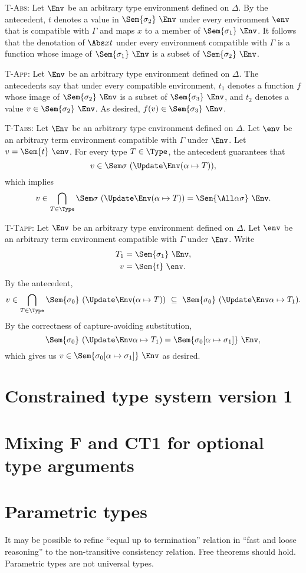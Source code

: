 \documentclass{amsart}
\begin{document}
\textsc{T-Abs}: Let $\Env$ be an arbitrary type environment
defined on $\Delta$. By the antecedent, $t$ denotes a value in
$\Sem{\sigma_2}~\Env$ under every environment $\env$ that is
compatible with $\Gamma$ and maps $x$ to a member of
$\Sem{\sigma_1}~\Env$. It follows that the denotation of $\Abs
xt$ under every environment compatible with $\Gamma$ is a
function whose image of $\Sem{\sigma_1}~\Env$ is a subset of
$\Sem{\sigma_2}~\Env$.

\textsc{T-App}: Let $\Env$ be an arbitrary type environment
defined on $\Delta$. The antecedents say that under every
compatible environment, $t_1$ denotes a function $f$ whose image
of $\Sem{\sigma_2}~\Env$ is a subset of $\Sem{\sigma_3}~\Env$,
and $t_2$ denotes a value $v\in\Sem{\sigma_2}~\Env$. As desired,
$f(v)\in\Sem{\sigma_3}~\Env$.

\textsc{T-Tabs}: Let $\Env$ be an arbitrary type environment
defined on $\Delta$. Let $\env$ be an arbitrary term environment
compatible with $\Gamma$ under $\Env$. Let $v=\Sem{t}~\env$.
For every type $T\in\Type$, the antecedent guarantees that
\[
v\in\Sem\sigma~(\Update\Env(\alpha\mapsto T)),
\]
which implies
\[
v\in\bigcap_{T\in\Type}\Sem\sigma~(\Update\Env(\alpha\mapsto T))
=\Sem{\All\alpha\sigma}~\Env.
\]

\textsc{T-Tapp}: Let $\Env$ be an arbitrary type environment
defined on $\Delta$. Let $\env$ be an arbitrary term environment
compatible with $\Gamma$ under $\Env$. Write
\begin{align*}
T_1&=\Sem{\sigma_1}~\Env,\\
v&=\Sem{t}~\env.
\end{align*}
By the antecedent,
\[
v\in
\bigcap_{T\in\Type}\Sem{\sigma_0}~(\Update\Env(\alpha\mapsto T))
\ \subseteq\ \Sem{\sigma_0}~(\Update\Env\alpha\mapsto T_1).
\]
By the correctness of capture-avoiding substitution,
\[
\Sem{\sigma_0}~(\Update\Env\alpha\mapsto T_1)
=
\Sem{\sigma_0[\alpha\mapsto\sigma_1]}~\Env,
\]
which gives us $v\in\Sem{\sigma_0[\alpha\mapsto\sigma_1]}~\Env$
as desired.


\section{Constrained type system version 1}



\section{Mixing F and CT1 for optional type arguments}



\section{Parametric types}

It may be possible to refine ``equal up to termination'' relation
in ``fast and loose reasoning'' to the non-transitive consistency
relation. Free theorems should hold. Parametric types are not
universal types.



\end{document}
